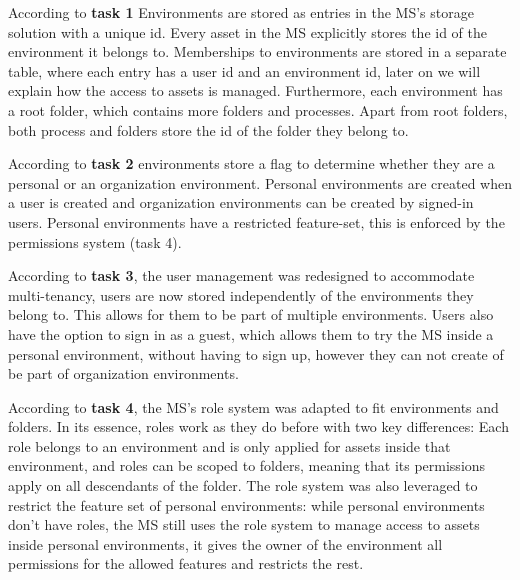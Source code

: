 According to \textbf{task 1} Environments are stored as entries in the MS's storage
solution with a unique id.
Every asset in the MS explicitly stores the id of the environment it belongs to.
Memberships to environments are stored in a separate table, where each entry has a user id
and an environment id,
later on we will explain how the access to assets is managed.
Furthermore, each environment has a root folder, which contains more folders and
processes.
Apart from root folders, both process and folders store the id of the folder they belong
to.

According to \textbf{task 2} environments store a flag to determine whether they are a
personal or an organization environment.
Personal environments are created when a user is created and organization environments can
be created by signed-in users.
Personal environments have a restricted feature-set, this is enforced by the permissions
system (task 4).

According to \textbf{task 3}, the user management was redesigned to accommodate
multi-tenancy,
users are now stored independently of the environments they belong to.
This allows for them to be part of multiple environments.
Users also have the option to sign in as a guest, which allows them to try the MS inside
a personal environment, without having to sign up, however they can not create of be part
of organization environments.

According to \textbf{task 4}, the MS's role system was adapted to fit environments and
folders. In its essence, roles work as they do before with two key differences:
Each role belongs to an environment and is only applied for assets inside that
environment, and roles can be scoped to folders, meaning that its permissions apply on all
descendants of the folder.
The role system was also leveraged to restrict the feature set of personal environments:
while personal environments don't have roles, the MS still uses the role system to manage
access to assets inside personal environments, it gives the owner of the environment all
permissions for the allowed features and restricts the rest.

